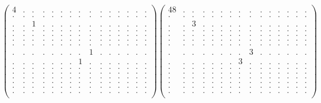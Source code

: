 \documentclass[12pt,a4paper]{amsart}
\begin{document}
\begin{align*}
\left(\begin{array}{rrrrrrrrrrrrrrr}%
4&.&.&.&.&.&.&.&.&.&.&.&.&.&.\\%
.&.&.&.&.&.&.&.&.&.&.&.&.&.&.\\%
.&.&1&.&.&.&.&.&.&.&.&.&.&.&.\\%
.&.&.&.&.&.&.&.&.&.&.&.&.&.&.\\%
.&.&.&.&.&.&.&.&.&.&.&.&.&.&.\\%
.&.&.&.&.&.&.&.&.&.&.&.&.&.&.\\%
.&.&.&.&.&.&.&.&.&.&.&.&.&.&.\\%
.&.&.&.&.&.&.&.&1&.&.&.&.&.&.\\%
.&.&.&.&.&.&.&1&.&.&.&.&.&.&.\\%
.&.&.&.&.&.&.&.&.&.&.&.&.&.&.\\%
.&.&.&.&.&.&.&.&.&.&.&.&.&.&.\\%
.&.&.&.&.&.&.&.&.&.&.&.&.&.&.\\%
.&.&.&.&.&.&.&.&.&.&.&.&.&.&.\\%
.&.&.&.&.&.&.&.&.&.&.&.&.&.&.\\%
.&.&.&.&.&.&.&.&.&.&.&.&.&.&.\\%
\end{array}\right)%
\left(\begin{array}{rrrrrrrrrrrrrrr}%
48&.&.&.&.&.&.&.&.&.&.&.&.&.&.\\%
.&.&.&.&.&.&.&.&.&.&.&.&.&.&.\\%
.&.&3&.&.&.&.&.&.&.&.&.&.&.&.\\%
.&.&.&.&.&.&.&.&.&.&.&.&.&.&.\\%
.&.&.&.&.&.&.&.&.&.&.&.&.&.&.\\%
.&.&.&.&.&.&.&.&.&.&.&.&.&.&.\\%
.&.&.&.&.&.&.&.&.&.&.&.&.&.&.\\%
.&.&.&.&.&.&.&.&3&.&.&.&.&.&.\\%
.&.&.&.&.&.&.&3&.&.&.&.&.&.&.\\%
.&.&.&.&.&.&.&.&.&.&.&.&.&.&.\\%
.&.&.&.&.&.&.&.&.&.&.&.&.&.&.\\%
.&.&.&.&.&.&.&.&.&.&.&.&.&.&.\\%
.&.&.&.&.&.&.&.&.&.&.&.&.&.&.\\%
.&.&.&.&.&.&.&.&.&.&.&.&.&.&.\\%
.&.&.&.&.&.&.&.&.&.&.&.&.&.&.\\%
\end{array}\right)%
\end{align*}
\end{document}
